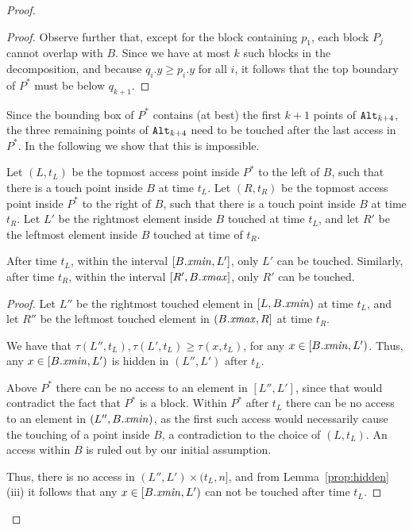 \begin{proof}
\begin{proof}
Observe further that, except for the block containing $p_1$, each block $P_j$ cannot overlap with $B$. %
Since we have at most $k$ such blocks in the decomposition, and because $q_i.y \ge p_i.y$ for all $i$, it follows that the top boundary of $P^*$ must be below $q_{k+1}$.  
 
\end{proof}

Since the bounding box of $P^*$ contains (at best) the first $k+1$ points of $\texttt{Alt}_{k+4}$, the three remaining points of $\texttt{Alt}_{k+4}$ need to be touched after the last access in $P^*$. In the following we show that this is impossible.

Let $(L, t_L)$ be the topmost access point inside $P^*$ to the left of $B$, such that there is a touch point inside $B$ at time $t_L$. Let $(R, t_R)$ be the topmost access point inside $P^*$ to the right of $B$, such that there is a touch point inside $B$ at time $t_R$. Let $L'$ be the rightmost element inside $B$ touched at time $t_L$, and let $R'$ be the leftmost element inside $B$ touched at time of $t_R$.

\begin{lemma}
\label{lem:onlybetween}
After time $t_L$, within the interval $[B.\mathit{xmin}, L']$, only $L'$ can be touched. Similarly, after time $t_R$, within the interval $[R', B.\mathit{xmax}]$, only $R'$ can be touched. 
\end{lemma}

\begin{proof}
Let $L''$ be the rightmost touched element in $[L,B.\mathit{xmin})$ at time $t_L$, and let $R''$ be the leftmost touched element in $(B.\mathit{xmax}, R]$ at time $t_R$. 

We have that $\tau(L'',t_L), \tau(L',t_L) \geq \tau(x,t_L)$, for any $x \in [B.\mathit{xmin}, L')$. Thus, any $x \in [B.\mathit{xmin}, L')$ is hidden in $(L'',L')$ after $t_L$.

Above $P^*$ there can be no access to an element in $[L'',L']$, since that would contradict the fact that $P^*$ is a block. Within $P^*$ after $t_L$ there can be no access to an element in $(L'',B.\mathit{xmin})$, as the first such access would necessarily cause the touching of a point inside $B$, a contradiction to the choice of $(L,t_L)$. An access within $B$ is ruled out by our initial assumption.

Thus, there is no access in $(L'',L') \times (t_L,n]$, and from Lemma~\ref{prop:hidden}(iii) it follows that any $x \in [B.\mathit{xmin}, L')$ can not be touched after time $t_L$.


\end{proof}
\end{proof}
